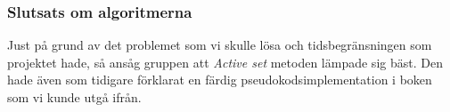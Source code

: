 \subsubsection{Slutsats om algoritmerna}
Just på grund av det problemet som vi skulle lösa och tidsbegränsningen som projektet hade, så ansåg gruppen att \emph{Active set} metoden lämpade sig bäst. Den hade även som tidigare förklarat en färdig pseudokodsimplementation i boken som vi kunde utgå ifrån.

